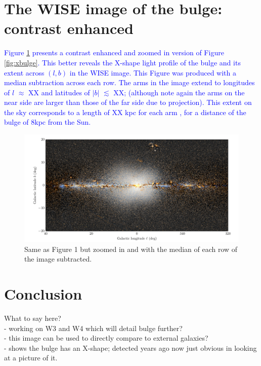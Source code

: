\documentclass[12pt, preprint]{aastex}
\begin{document}
\section{The WISE image of the bulge: contrast enhanced}

\textcolor{blue}{Figure \ref{fig:filt} presents a contrast enhanced and zoomed in version of Figure \ref{fig:xbulge}. This better reveals the X-shape light profile of the bulge and its extent across $(l,b)$ in the WISE image. This Figure was produced with a median subtraction across each row. The arms in the image extend to longitudes of $l$ $\approx$ XX and latitudes of $|b|$ $\lesssim$ XX; (although note again the arms on the near side are larger than those of the far side due to projection). This extent on the sky corresponds to a length of XX kpc for each arm  , for a distance of the bulge of 8kpc from the Sun. }

\begin{figure}[h!]
\centering
        \includegraphics[width=\textwidth]{xbulge-01}
\caption{Same as Figure 1 but zoomed in and with the median of each row of the image subtracted.}
\label{fig:filt}
\end{figure}



\section{Conclusion}

What to say here?\\
- working on W3 and W4 which will detail bulge further?\\
- this image can be used to directly compare to external galaxies? \\
- shows the bulge has an X-shape; detected years ago now just obvious in looking at a picture of it. \\




\end{document}
